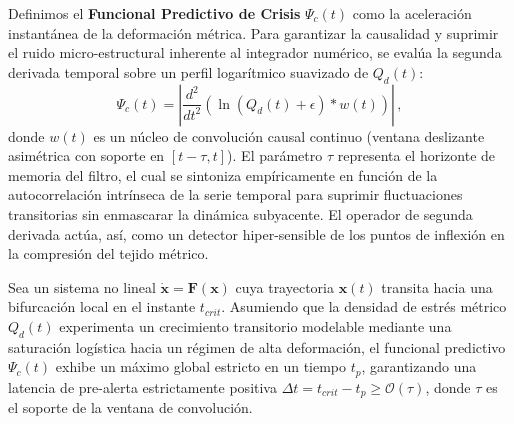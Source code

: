 \documentclass[11pt]{article}
\begin{document}
Definimos el \textbf{Funcional Predictivo de Crisis} $\Psi_c(t)$ como la aceleración instantánea de la deformación métrica. Para garantizar la causalidad y suprimir el ruido micro-estructural inherente al integrador numérico, se evalúa la segunda derivada temporal sobre un perfil logarítmico suavizado de $Q_d(t)$:
\begin{equation}
    \Psi_c(t) = \left| \frac{d^2}{dt^2} \left( \ln(Q_d(t) + \epsilon) * w(t) \right) \right| \,,
\end{equation}
donde $w(t)$ es un núcleo de convolución causal continuo (ventana deslizante asimétrica con soporte en $[t-\tau, t]$). El parámetro $\tau$ representa el horizonte de memoria del filtro, el cual se sintoniza empíricamente en función de la autocorrelación intrínseca de la serie temporal para suprimir fluctuaciones transitorias sin enmascarar la dinámica subyacente. El operador de segunda derivada actúa, así, como un detector hiper-sensible de los puntos de inflexión en la compresión del tejido métrico.

\begin{theorem}
\label{thm:pre_alerta}
Sea un sistema no lineal $\dot{\mathbf{x}} = \mathbf{F}(\mathbf{x})$ cuya trayectoria $\mathbf{x}(t)$ transita hacia una bifurcación local en el instante $t_{crit}$. Asumiendo que la densidad de estrés métrico $Q_d(t)$ experimenta un crecimiento transitorio modelable mediante una saturación logística hacia un régimen de alta deformación, el funcional predictivo $\Psi_c(t)$ exhibe un máximo global estricto en un tiempo $t_p$, garantizando una latencia de pre-alerta estrictamente positiva $\Delta t = t_{crit} - t_p \geq \mathcal{O}(\tau)$, donde $\tau$ es el soporte de la ventana de convolución.
\end{theorem}
\end{document}

